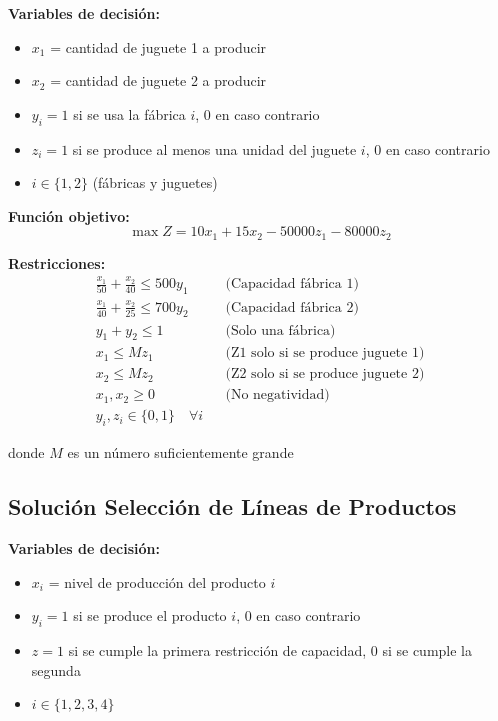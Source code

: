 \documentclass[12pt]{article}
\begin{document}
\textbf{Variables de decisión:}
\begin{itemize}
    \item $x_1$ = cantidad de juguete 1 a producir
    \item $x_2$ = cantidad de juguete 2 a producir
    \item $y_i = 1$ si se usa la fábrica $i$, 0 en caso contrario
    \item $z_i = 1$ si se produce al menos una unidad del juguete $i$, 0 en caso contrario
    \item $i \in \{1, 2\}$ (fábricas y juguetes)
\end{itemize}

\textbf{Función objetivo:}
$$\max Z = 10x_1 + 15x_2 - 50000z_1 - 80000z_2$$

\textbf{Restricciones:}
\begin{align*}
    \frac{x_1}{50} + \frac{x_2}{40} \leq 500y_1 && \text{(Capacidad fábrica 1)} \\
    \frac{x_1}{40} + \frac{x_2}{25} \leq 700y_2 && \text{(Capacidad fábrica 2)} \\
    y_1 + y_2 \leq 1 && \text{(Solo una fábrica)} \\
    x_1 \leq Mz_1 && \text{(Z1 solo si se produce juguete 1)} \\
    x_2 \leq Mz_2 && \text{(Z2 solo si se produce juguete 2)} \\
    x_1, x_2 \geq 0 && \text{(No negatividad)} \\
    y_i, z_i \in \{0,1\} \quad \forall i
\end{align*}
\begin{center}
donde $M$ es un número suficientemente grande
\end{center}

\subsection{Solución Selección de Líneas de Productos}

\textbf{Variables de decisión:}
\begin{itemize}
    \item $x_i$ = nivel de producción del producto $i$
    \item $y_i = 1$ si se produce el producto $i$, 0 en caso contrario
    \item $z = 1$ si se cumple la primera restricción de capacidad, 0 si se cumple la segunda
    \item $i \in \{1, 2, 3, 4\}$
\end{itemize}
\end{document}
